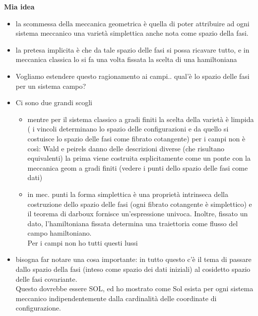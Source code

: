 \documentclass[Main]{subfiles}
\begin{document}
\begin{Warning}
	\textbf{Mia idea}
	\begin{itemize}
		\item la scommessa della meccanica geometrica è quella di poter attribuire ad ogni sistema meccanico una varietà simplettica anche nota come spazio della fasi.
		\item la pretesa implicita è che da tale spazio delle fasi si possa ricavare tutto, e in meccanica classica lo si fa una volta fissata la scelta di una hamiltoniana
		\item Vogliamo estendere questo ragionamento ai campi.. qual'è lo spazio delle fasi per un sistema campo?
		\item Ci sono due grandi scogli
			\begin{itemize}
				\item mentre per il sistema classico a gradi finiti la scelta della varietà è limpida ( i vincoli determinano lo spazio delle configurazioni e da quello si costuisce lo spazio delle fasi come fibrato cotangente) per i campi non è così: Wald e peirels danno delle descrizioni diverse (che risultano equivalenti) la prima viene costruita esplicitamente come un ponte  con la meccanica geom a gradi finiti (vedere i punti dello spazio delle fasi come dati)
				\item in mec. punti la forma simplettica è una proprietà intrinseca della costruzione dello spazio delle fasi (ogni fibrato cotangente è simplettico) e il teorema di darboux fornisce un'espressione univoca.
					Inoltre, fissato un dato, l'hamiltoniana fissata determina una traiettoria come flusso del campo hamiltoniano.\\
					Per i campi non ho tutti questi lussi				
			\end{itemize}
		\item bisogna far notare una cosa importante: in tutto questo c'è il tema di passare dallo spazio della fasi (inteso come spazio dei dati iniziali) al cosidetto spazio delle fasi covariante.\\
			Questo dovrebbe essere SOL, ed ho mostrato come Sol esista per ogni sistema meccanico indipendentemente dalla cardinalità delle coordinate di configurazione.
	\end{itemize}
	
		
	\end{Warning}	
\fi
	
\end{document}

